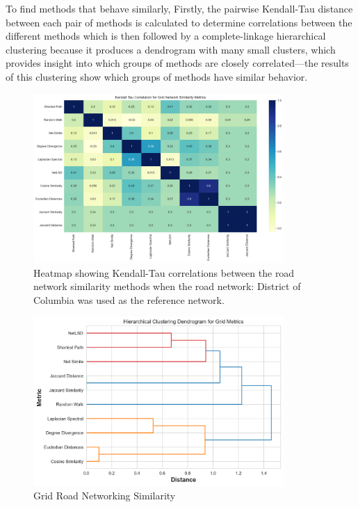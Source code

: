 To find methods that behave similarly, Firstly, the pairwise Kendall-Tau distance between each pair of methods is calculated to determine correlations between the different methods which is then followed by a complete-linkage hierarchical clustering because it produces a dendrogram with many small clusters, which provides insight into which groups of methods are closely correlated—the results of this clustering show which groups of methods have similar behavior. 


\begin{figure}[!ht]
\centering
\includegraphics[width=0.85\textwidth,center]{picture/Grid/grid2.png}
\caption[Miniaturtrichter]{Heatmap showing Kendall-Tau correlations between the road network similarity methods when the road network: District of Columbia was used as the reference network.}
\label{fig:network ranking}
\end{figure}

\begin{figure}[!ht]
\centering
\includegraphics[width=0.85\textwidth,center]{picture/Grid/grid_metrics_dendrogram.png}
\caption[Miniaturtrichter]{Grid Road Networking Similarity}
\label{fig:network ranking}
\end{figure}



